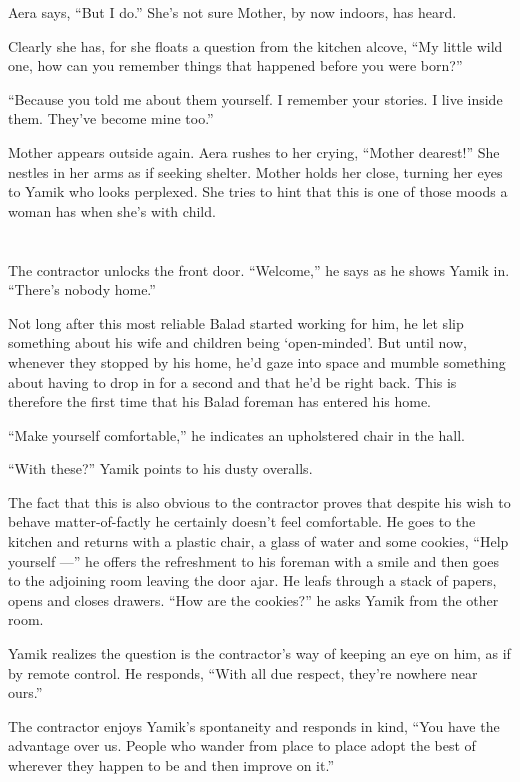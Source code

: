 \documentclass[twoside,11pt,openany]{book}
\begin{document}
Aera says, ``But I do.'' She's not sure Mother, by now indoors, has heard.

Clearly she has, for she floats a question from the kitchen alcove, ``My little wild one, how can you
remember things that happened before you were born?''

``Because you told me about them yourself. I remember your stories. I live inside them. They've become mine
too.''

Mother appears outside again. Aera rushes to her crying, ``Mother dearest!'' She nestles in
her arms as if seeking shelter. Mother holds her close, turning her eyes to Yamik who looks perplexed. She tries to hint
that this is one of those moods a woman has when she's with child.



\chapter{}

The contractor unlocks the front door. ``Welcome,'' he says as he shows Yamik in.
``There's nobody home.''

Not long after this most reliable Balad started working for him, he let slip something about his wife and children
being `open-minded{}'. But until now, whenever they stopped by his home, he'd gaze into space and mumble something
about having to drop in for a second and that he'd be right back.  This is therefore the first time that his Balad
foreman has entered his home.

``Make yourself comfortable,'' he indicates an upholstered chair in the hall.

``With these?'' Yamik points to his dusty overalls.

The fact that this is also obvious to the contractor proves that despite his wish to behave matter-of-factly he certainly
doesn't feel comfortable. He goes to the kitchen and returns with a plastic chair, a glass of water and some cookies,
``Help yourself ---'' he offers the refreshment to his foreman with a smile and then goes to
the adjoining room leaving the door ajar. He leafs through a stack of papers, opens and closes
drawers. ``How are the cookies?'' he asks Yamik from the other room.

Yamik realizes the question is the contractor's way of keeping an eye on him,
as if by remote control. He responds,
``With all due respect, they're nowhere near ours.''

The contractor enjoys Yamik's spontaneity and responds in kind, ``You have the advantage over us. People
who wander from place to place adopt the best of wherever they happen to be and then improve on it.''
\end{document}
